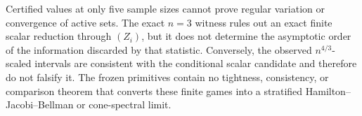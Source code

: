 Certified values at only five sample sizes cannot prove regular variation or convergence of active sets.  The exact \(n=3\) witness rules out an exact finite scalar reduction through \((Z_i)\), but it does not determine the asymptotic order of the information discarded by that statistic.  Conversely, the observed \(n^{4/3}\)-scaled intervals are consistent with the conditional scalar candidate and therefore do not falsify it.  The frozen primitives contain no tightness, consistency, or comparison theorem that converts these finite games into a stratified Hamilton--Jacobi--Bellman or cone-spectral limit.